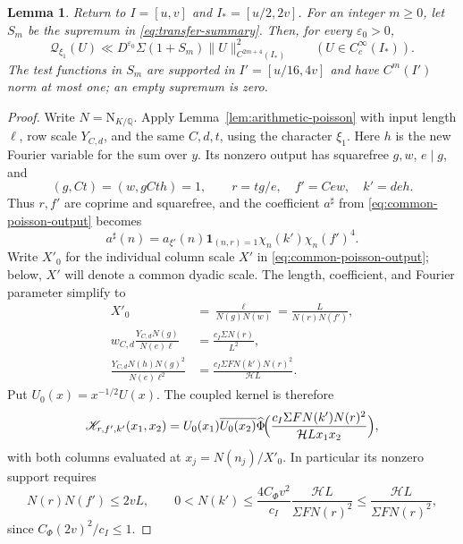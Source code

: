 \documentclass[11pt,a4paper]{article}
\numberwithin{equation}{section}
\numberwithin{figure}{section}
\newtheorem{lemma}[theorem]{Lemma}
\theoremstyle{definition}
\theoremstyle{remark}
\newcommand{\Q}{\mathbb Q}
\newcommand{\NK}{\mathrm N_{K/\Q}}
\newcommand{\ind}{\mathbf1}
\begin{document}
\begin{lemma}\label{lem:second-transfer}
Return to $I=[u,v]$ and $I_*=[u/2,2v]$. For an integer $m\ge0$,
let $S_m$ be the supremum in \eqref{eq:transfer-summary}.
Then, for every $\varepsilon_0>0$,
\[
 \mathcal Q_{\xi_1}(U)\ll D^{\varepsilon_0}\Sigma(1+S_m)
       \|U\|_{C^{2m+4}(I_*)}^2
 \qquad(U\in C_c^\infty(I_*)).
\]
The test functions in $S_m$ are supported in $I'=[u/16,4v]$ and have $C^m(I')$ norm at most one; an empty supremum is zero.
\end{lemma}
\begin{proof}
Write $N=\NK$.
Apply Lemma~\ref{lem:arithmetic-poisson} with input length $\ell$,
row scale $Y_{C,d}$, and the same $C,d,t$, using the character $\xi_1$.
Here $h$ is the new Fourier variable for the sum over $y$.
Its nonzero output has squarefree $g,w$, $e\mid g$, and
\[
 (g,Ct)=(w,gCth)=1,\qquad
 r=tg/e,\quad f'=Cew,\quad k'=deh.
\]
Thus $r,f'$ are coprime and squarefree, and the coefficient $a^\sharp$ from \eqref{eq:common-poisson-output} becomes
\[
 a^\sharp(n)
 =a_{\xi'}(n)\ind_{(n,r)=1}\chi_n(k')\chi_n(f')^4.
\]
Write $X'_0$ for the individual column scale $X'$ in
\eqref{eq:common-poisson-output}; below, $X'$ will denote a common
dyadic scale. The length, coefficient, and Fourier parameter simplify to
\[
 \begin{aligned}
 X'_0&=\frac{\ell}{N(g)N(w)}=\frac L{N(r)N(f')},\\
 w_{C,d}\frac{Y_{C,d}N(g)}{N(e)\ell}
 &=\frac{c_I\Sigma N(r)}{L^2},\\
 \frac{Y_{C,d}N(h)N(g)^2}{N(e)\ell^2}
 &=\frac{c_I\Sigma F N(k')N(r)^2}{\mathcal H L}.
 \end{aligned}
\]
Put $U_0(x)=x^{-1/2}U(x)$. The coupled kernel is therefore
\[
 \mathscr K_{r,f',k'}(x_1,x_2)
 =U_0(x_1)\overline{U_0(x_2)}
       \widehat\Phi\!\Bigl(\frac{c_I\Sigma F N(k')N(r)^2}{\mathcal H Lx_1x_2}\Bigr),
\]
with both columns evaluated at $x_j=N(n_j)/X'_0$.
In particular its nonzero support requires
\[
 N(r)N(f')\le 2vL,\qquad
 0<N(k')\le\frac{4C_\Phi v^2}{c_I}
              \frac{\mathcal H L}{\Sigma F N(r)^2}
          \le\frac{\mathcal H L}{\Sigma F N(r)^2},
\]
since $C_\Phi(2v)^2/c_I\le1$.


\end{proof}
\end{document}
